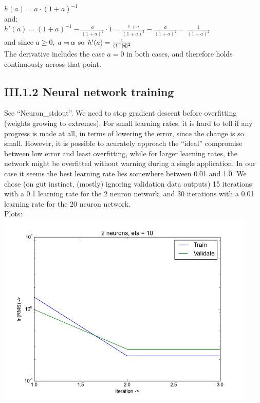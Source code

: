 \documentclass{article}
\theoremstyle{dotless}
\begin{document}
$h(a)=a\cdot(1+a)^{-1}$\\

and:\\

$h'(a)=(1+a)^{-1}-\frac{a}{(1+a)^2}\cdot 1=\frac{1+a}{(1+a)^2}-\frac{a}{(1+a)^2}=\frac{1}{(1+a)^2}$\\

and since $a\geq 0$, $a=\vline a\vline$ so $h'(a)=\frac{1}{(1+\vline a\vline)^2}$\\

The derivative includes the case $a=0$ in both cases, and therefore holds continuously across that point.

\subsection{III.1.2 Neural network training}

See ``Neuron\_stdout''. We need to stop gradient descent before overfitting (weights growing to extremes). For small learning rates, it is hard to tell if any progress is made at all, in terms of lowering the error, since the change is so small. However, it is possible to acurately approach the ``ideal'' compromise between low error and least overfitting, while for larger learning rates, the network might be overfitted without warning during a single application. In our case it seems the best learning rate lies somewhere between 0.01 and 1.0. We chose (on gut instinct, (mostly) ignoring validation data outputs) 15 iterations with a 0.1 learning rate for the 2 neuron network, and 30 iterations with a 0.01 learning rate for the 20 neuron network.\\

Plots:\\

\includegraphics[keepaspectratio=true, width=350pt]{src/img/n_2_eta_10.png}
\end{document}
